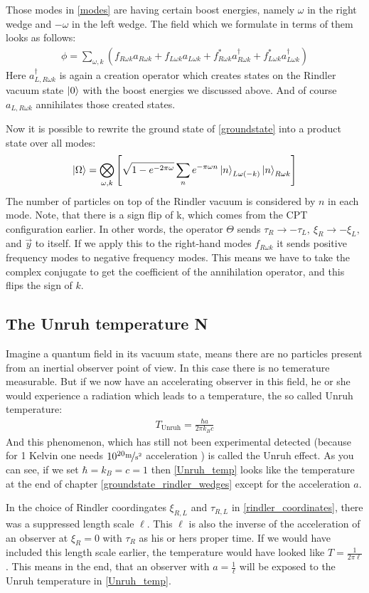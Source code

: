 	Those modes in \eqref{modes} are having certain boost energies, namely $\omega$ in the right wedge and $-\omega$ in the left wedge. The field which we formulate in terms of them looks as follows:
	\begin{align}
		\phi = \sum_{\omega, k} 
		\left(
			f_{R\omega k} a_{R\omega k} + f_{L\omega k}a_{L\omega k} + f^*_{R\omega k} a^\dagger_{R\omega k} + f^*_{L\omega k} a^\dagger_{L\omega k}
		\right)
	\end{align}
	Here $a^\dagger_{L,R\omega k}$ is again a creation operator which creates states on the Rindler vacuum state $\ket{0}$ with the boost energies we discussed above. And of course $a_{L,R\omega k}$ annihilates those created states. 
	
	Now it is possible to rewrite the ground state of \eqref{groundstate} into a product state over all modes:
	\begin{align}
		\ket{\Omega} = \bigotimes_{\omega, k} 
		\left[
			\sqrt{1-e^{-2\pi \omega}} \sum_n e^{-\pi \omega n} \ket{n}_{L \omega (-k)} \ket{n}_{R \omega k}
		\right]
	\end{align}
	The number of particles on top of the Rindler vacuum is considered by $n$ in each mode. Note, that there is a sign flip of k, which comes from the CPT configuration earlier. In other words, the operator $\Theta$ sends $\tau_R \rightarrow -\tau_L,~ \xi_R \rightarrow -\xi_L,$ and $\vec{y}$ to itself. If we apply this to the right-hand modes $f_{R\omega k}$ it sends positive frequency modes to negative frequency modes. This means we have to take the complex conjugate to get the coefficient of the annihilation operator, and this flips the sign of $k$.
\subsection{The Unruh temperature N} \label{Unruh}
Imagine a quantum field in its vacuum state, means there are no particles present from an inertial observer point of view. In this case there is no temerature measurable. But if we now have an accelerating observer in this field, he or she would experience a radiation which leads to a temperature, the so called Unruh temperature:
	\begin{align} \label{Unruh_temp}
		T_{\text{Unruh}}=\frac{\hbar a}{2\pi k_B c}
	\end{align}
And this phenomenon, which has still not been experimental detected (because for 1 Kelvin one needs $10^{20} \unitfrac{m}{s^2}$ acceleration \cite{scholarUnruh}) is called the Unruh effect. As you can see, if we set $\hbar = k_B = c = 1$ then \eqref{Unruh_temp} looks like the temperature at the end of chapter \ref{groundstate_rindler_wedges} except for the acceleration $a$.  

In the choice of Rindler coordingates $\xi_{R,L}$ and $\tau_{R,L}$ in \eqref{rindler_coordinates}, there was a suppressed length scale $\ell$. This $\ell$ is also the inverse of the acceleration of an observer at $\xi_{R}=0$ with $\tau_R$ as his or hers proper time. If we would have included this length scale earlier, the temperature would have looked like $T=\frac{1}{2\pi \ell}$. This means in the end, that an observer with $a=\frac{1}{\ell}$ will be exposed to the Unruh temperature in \eqref{Unruh_temp}.